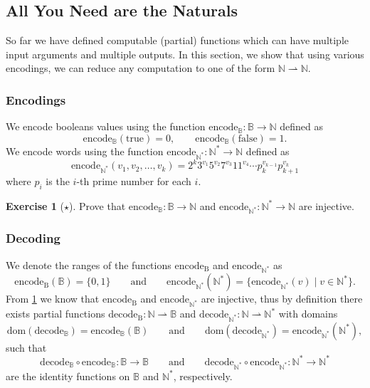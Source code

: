 \documentclass[11pt,a4paper,reqno]{amsart}
\theoremstyle{plain}
\theoremstyle{definition}
\theoremstyle{definition}
\newtheorem{exercise}[theorem]{Exercise}
\newcommand\exerciseLevelEasy{$\star$}
\begin{document}
\subsection{All You Need are the Naturals}\label{sec:only-natural}

So far we have defined computable (partial) functions which can have multiple input arguments and multiple outputs.
In this section, we show that using various encodings, we can reduce any computation to one of the form $\mathbb N \rightharpoonup \mathbb N$.

\subsubsection{Encodings}
We encode booleans values using the function $\mathrm{encode}_{\mathbb{B}}\colon \mathbb B \to \mathbb N$ defined as
\[
	\mathrm{encode}_{\mathbb B} (\mathrm{true}) = 0,
	\qquad
	\mathrm{encode}_{\mathbb B} (\mathrm{false}) = 1.
\]
We encode words using the function $\mathrm{encode}_{\mathbb N^*}\colon \mathbb N^* \to \mathbb N$ defined as
\[
	\mathrm{encode}_{\mathbb N^*}(v_1,v_2,\ldots ,v_k)
	=
	2^k 3^{v_1} 5^{v_2} 7^{v_3} 11^{v_4}\cdots p_{k}^{v_{k-1}} p_{k+1}^{v_k}
\]
where $p_i$ is the $i$-th prime number for each $i$.

\begin{exercise}[\exerciseLevelEasy]\label{ex:prove-inj-of-encoding}
	Prove that $\mathrm{encode}_{\mathbb{B}}\colon \mathbb B \to \mathbb N$ and  $\mathrm{encode}_{\mathbb N^*}\colon \mathbb N^* \to \mathbb N$ are injective.
\end{exercise}

\subsubsection{Decoding}

We denote the ranges of the functions
$\mathrm{encode}_{\mathrm B}$ and
$\mathrm{encode}_{\mathbb N^*}$ as
\[
	\mathrm{encode}_{\mathrm B}(\mathbb B) = \{0,1\}
	\qquad
	\text{and}
	\qquad
	\mathrm{encode}_{\mathbb N^*}(\mathbb N^*) = \{
	\mathrm{encode}_{\mathbb N^*}(v)
	\mid
	v\in \mathbb N^*
	\}.
\]
From \cref{ex:prove-inj-of-encoding} we know that
$\mathrm{encode}_{\mathrm B}$ and
$\mathrm{encode}_{\mathbb N^*}$ are injective, thus by definition there exists partial functions
$\mathrm{decode}_{\mathrm B}\colon \mathbb N \rightharpoonup \mathbb B$ and
$\mathrm{decode}_{\mathbb N^*}\colon \mathbb N \rightharpoonup \mathbb N^*$ with domains
\[
	\mathrm{dom}(\mathrm{decode}_{\mathbb B}) = \mathrm{encode}_{\mathbb B}(\mathbb B)
	\qquad
	\text{and}
	\qquad
	\mathrm{dom}(\mathrm{decode}_{\mathbb N^*}) = \mathrm{encode}_{\mathbb N^*}(\mathbb N^*),
\]
such that
\[
	\mathrm{decode}_{\mathbb B}\circ \mathrm{encode}_{\mathbb B}\colon \mathbb B \to \mathbb B
	\qquad\text{and}\qquad
	\mathrm{decode}_{\mathbb N^*}\circ \mathrm{encode}_{\mathbb N^*}\colon \mathbb N^* \to \mathbb N^*
\]
are the identity functions on $\mathbb B$ and $\mathbb N^*$, respectively.
\end{document}
